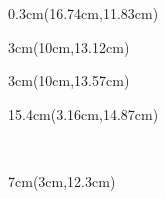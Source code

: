 \documentclass[a4paper]{article}
\begin{document}
\begin{Form}
\begin{textblock*}{0.3cm}(16.74cm,11.83cm) %
\noindent
\end{textblock*}

\begin{textblock*}{3cm}(10cm,13.12cm) %
\noindent
\Amtsgericht
\end{textblock*}

\begin{textblock*}{3cm}(10cm,13.57cm) %
\noindent
\Registernummer
\end{textblock*}

\begin{textblock*}{15.4cm}(3.16cm,14.87cm) %
\noindent
\WeitereAngabenSvier
\end{textblock*}

~\clearpage

\BgThispage

\begin{textblock*}{7cm}(3cm,12.3cm) %
\noindent
\OrtDatum
\end{textblock*}

\clearpage
\end{Form}
\end{document}
